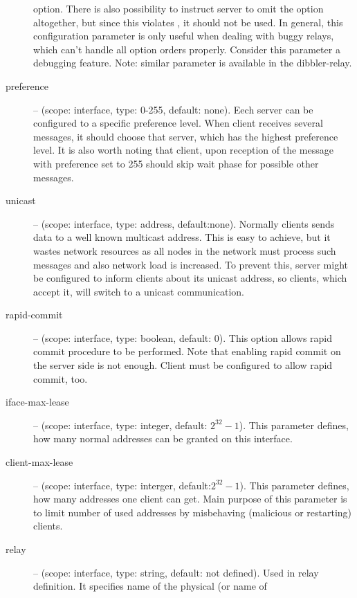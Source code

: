 \begin{description}
         option. There is also possibility to instruct
        server to omit the  option altogether, but since 
        this violates \cite{rfc3315}, it should not be used. In general, this
        configuration parameter is only useful when dealing with buggy relays,
        which can't handle all option orders properly. Consider this parameter
        a debugging feature. Note: similar parameter is available in the dibbler-relay. 
 \item[preference] -- (scope: interface, type: 0-255, default:
	    none). Eech server can be configured to a specific
	    preference level. When client receives several
	     messages, it should choose that server,
	    which has the highest preference level. It is also worth
	    noting that client, upon reception of the 
	    message with preference set to 255 should skip wait phase
	    for possible other  messages.
 \item[unicast] -- (scope: interface, type: address,
	    default:none). Normally clients sends data to a well known
	    multicast address. This is easy to achieve, but it wastes
	    network resources as all nodes in the network must process
	    such messages and also network load is increased. To prevent
	    this, server might be configured to inform clients about its
	    unicast address, so clients, which accept it, will switch to
	    a unicast communication.
 \item[rapid-commit] -- (scope: interface, type: boolean, default:
            0). This option allows rapid commit procedure to be
            performed. Note that enabling rapid commit on the server
            side is not enough. Client must be configured to allow
	    rapid commit, too.
\item[iface-max-lease] -- (scope: interface, type: integer, default:
            $2^{32}-1$). This parameter defines, how many normal
            addresses can be granted on this interface.
\item[client-max-lease] -- (scope: interface, type: interger,
            default:$2^{32}-1$). This parameter defines, how many
            addresses one client can get. Main purpose of this
            parameter is to limit number of used addresses by
            misbehaving (malicious or restarting) clients.
\item[relay] -- (scope: interface, type: string, default: not
            defined). Used in relay definition.
            It specifies name of the physical (or name of

\end{description}
